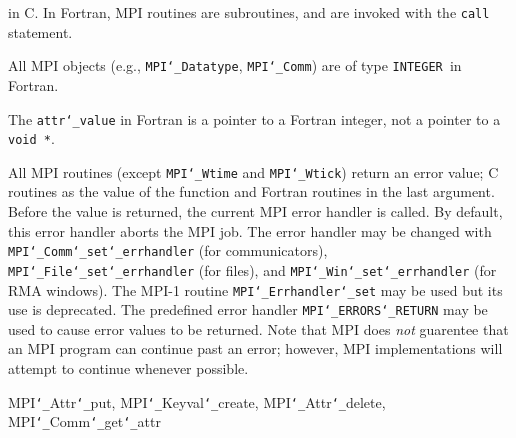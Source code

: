 in C.  In Fortran, MPI routines are subroutines, and are invoked with the
{\tt call} statement.
\par
All MPI objects (e.g., {\tt MPI{\tt \char`\_}Datatype}, {\tt MPI{\tt \char`\_}Comm}) are of type {\tt INTEGER
}in Fortran.
\par
The {\tt attr{\tt \char`\_}value} in Fortran is a pointer to a Fortran integer, not
a pointer to a {\tt void *}.
\par
{}
\par
All MPI routines (except {\tt MPI{\tt \char`\_}Wtime} and {\tt MPI{\tt \char`\_}Wtick}) return an error value;
C routines as the value of the function and Fortran routines in the last
argument.  Before the value is returned, the current MPI error handler is
called.  By default, this error handler aborts the MPI job.  The error handler
may be changed with {\tt MPI{\tt \char`\_}Comm{\tt \char`\_}set{\tt \char`\_}errhandler} (for communicators),
{\tt MPI{\tt \char`\_}File{\tt \char`\_}set{\tt \char`\_}errhandler} (for files), and {\tt MPI{\tt \char`\_}Win{\tt \char`\_}set{\tt \char`\_}errhandler} (for
RMA windows).  The MPI-1 routine {\tt MPI{\tt \char`\_}Errhandler{\tt \char`\_}set} may be used but
its use is deprecated.  The predefined error handler
{\tt MPI{\tt \char`\_}ERRORS{\tt \char`\_}RETURN} may be used to cause error values to be returned.
Note that MPI does {\em not} guarentee that an MPI program can continue past
an error; however, MPI implementations will attempt to continue whenever
possible.
\par
{}
\par
{}
MPI{\tt \char`\_}Attr{\tt \char`\_}put, MPI{\tt \char`\_}Keyval{\tt \char`\_}create, MPI{\tt \char`\_}Attr{\tt \char`\_}delete, MPI{\tt \char`\_}Comm{\tt \char`\_}get{\tt \char`\_}attr
\nextline
{}
\endmanpage

